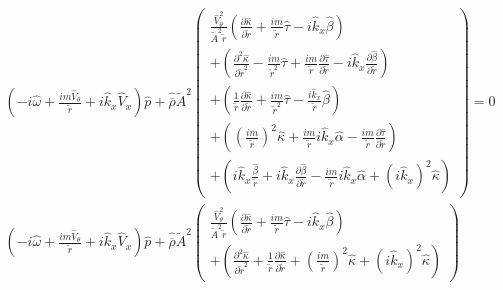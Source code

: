 \documentclass[12pt]{article}
\begin{document}
\begin{eqnarray}
\left(
-i \widehat{\omega}
+ \frac{i m \widehat{V}_{\theta}}{\widetilde{r}}
+i \widehat{k}_x \widehat{V}_x 
\right) 
\widehat{p} 
+
\widehat{\overline{\rho}} \widetilde{A}^2
\left(
\begin{array}{r}
\frac{\widehat{V}_{\theta}^2}{\widetilde{A}^2 \widetilde{r}}
\left(
\frac{\partial \widehat{\kappa}}{\partial \widetilde{r}}
+
\frac{i m}{\widetilde{r}}
\widehat{\tau}
-
i \widehat{k}_x \widehat{\beta}
\right) 
\\
+ 
\left(
\frac{\partial^2 \widehat{\kappa}}{\partial \widetilde{r}^2}
-
\frac{i m}{\widetilde{r}^2}
\widehat{\tau}
+
\frac{i m}{\widetilde{r}}
\frac{\partial \widehat{\tau}}{\partial \widetilde{r}}
-
i \widehat{k}_x 
\frac{\partial \widehat{\beta}}{\partial \widetilde{r}}
\right) 
\\
+ 
\left(
\frac{1}{\widetilde{r}} 
\frac{\partial \widehat{\kappa}}{\partial \widetilde{r}}
+
\frac{i m}{\widetilde{r}^2}
\widehat{\tau}
-
\frac{i \widehat{k}_x}{\widetilde{r}} 
\widehat{\beta}
\right) 
\\
+
\left(
\left(\frac{i m}{\widetilde{r}} \right)^2 \widehat{\kappa}
+
\frac{i m }{\widetilde{r}} 
i \widehat{k}_x \widehat{\alpha}
-
\frac{i m }{\widetilde{r}} 
\frac{\partial \widehat{\tau}}{\partial \widetilde{r}}
\right) 
\\
+ 
\left(
i \widehat{k}_x 
\frac{\widehat{\beta}}{\widetilde{r}}
+
i \widehat{k}_x 
\frac{\partial \widehat{\beta}}{\partial \widetilde{r}}
-
\frac{i m}{\widetilde{r}}
i \widehat{k}_x 
\widehat{\alpha}
+ 
\left(i \widehat{k}_x \right)^2 \widehat{\kappa}
\right) 
\end{array}
\right)
 = 
0
\nonumber
\\
\left(
-i \widehat{\omega}
+ \frac{i m \widehat{V}_{\theta}}{\widetilde{r}}
+i \widehat{k}_x \widehat{V}_x 
\right) 
\widehat{p} 
+
\widehat{\overline{\rho}} \widetilde{A}^2
\left(
\begin{array}{r}
\frac{\widehat{V}_{\theta}^2}{\widetilde{A}^2 \widetilde{r}}
\left(
\frac{\partial \widehat{\kappa}}{\partial \widetilde{r}}
+
\frac{i m}{\widetilde{r}}
\widehat{\tau}
-
i \widehat{k}_x \widehat{\beta}
\right) 
\\
+ 
\left(
\frac{\partial^2 \widehat{\kappa}}{\partial \widetilde{r}^2}
+ 
\frac{1}{\widetilde{r}} 
\frac{\partial \widehat{\kappa}}{\partial \widetilde{r}}
+
\left(\frac{i m}{\widetilde{r}} \right)^2 \widehat{\kappa}
+ 
\left(i \widehat{k}_x \right)^2 \widehat{\kappa}
\right)
\end{array}
\right)

\end{eqnarray}
\end{document}
